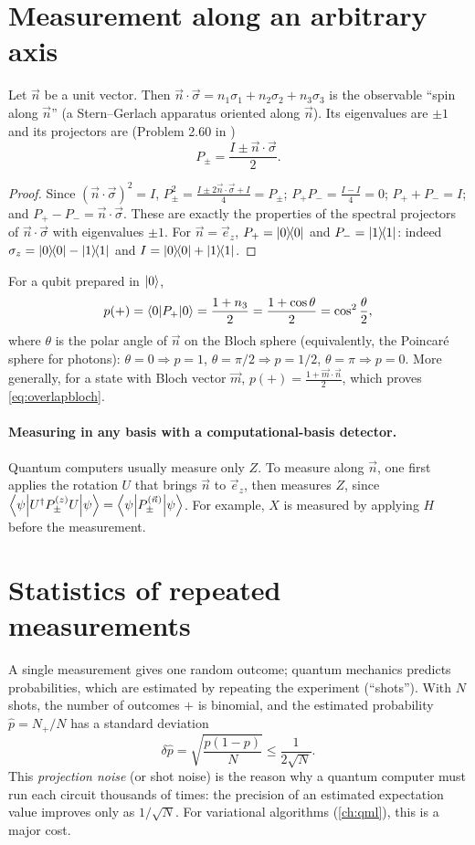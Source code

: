 \section{Measurement along an arbitrary axis}
Let $\vec n$ be a unit vector. Then $\vec n\cdot\vec\sigma=n_1\sigma_1+n_2\sigma_2+n_3\sigma_3$ is the observable ``spin along $\vec n$''
(a Stern--Gerlach apparatus oriented along $\vec n$). Its eigenvalues are $\pm1$ and its projectors are (Problem 2.60 in \cite{NielsenChuang})
\begin{equation}\label{eq:projector}
  P_\pm=\frac{I\pm\vec n\cdot\vec\sigma}2.
\end{equation}
\begin{proof}
Since $(\vec n\cdot\vec\sigma)^2=I$, $P_\pm^2=\frac{I\pm2\vec n\cdot\vec\sigma+I}{4}=P_\pm$; $P_+P_-=\frac{I-I}4=0$; $P_++P_-=I$; and
$P_+-P_-=\vec n\cdot\vec\sigma$. These are exactly the properties of the spectral projectors of $\vec n\cdot\vec\sigma$ with eigenvalues $\pm1$.
For $\vec n=\vec e_z$, $P_+=\left|0\middle\rangle\!\middle\langle0\right|$ and $P_-=\left|1\middle\rangle\!\middle\langle1\right|$: indeed $\sigma_z=\left|0\middle\rangle\!\middle\langle0\right|-\left|1\middle\rangle\!\middle\langle1\right|$ and $I=\left|0\middle\rangle\!\middle\langle0\right|+\left|1\middle\rangle\!\middle\langle1\right|$.
\end{proof}
For a qubit prepared in $\left|0\right\rangle$,
\begin{equation}
  p(+)=\left\langle0\middle|P_+\middle|0\right\rangle=\frac{1+n_3}2=\frac{1+\cos\theta}2=\cos^2\frac\theta2,
\end{equation}
where $\theta$ is the polar angle of $\vec n$ on the Bloch sphere (equivalently, the Poincaré sphere for photons): $\theta=0\Rightarrow p=1$,
$\theta=\pi/2\Rightarrow p=1/2$, $\theta=\pi\Rightarrow p=0$. More generally, for a state with Bloch vector $\vec m$,
$p(+)=\frac{1+\vec m\cdot\vec n}2$, which proves \cref{eq:overlapbloch}.

\paragraph{Measuring in any basis with a computational-basis detector.} Quantum computers usually measure only $Z$. To measure along $\vec n$,
one first applies the rotation $U$ that brings $\vec n$ to $\vec e_z$, then measures $Z$, since
$\left\langle\psi\middle|U^\dagger P_\pm^{(z)}U\middle|\psi\right\rangle=\left\langle\psi\middle|P_\pm^{(\vec n)}\middle|\psi\right\rangle$. For example, $X$ is measured by applying $H$ before the measurement.

\section{Statistics of repeated measurements}
A single measurement gives one random outcome; quantum mechanics predicts probabilities, which are estimated by repeating the experiment
(``shots''). With $N$ shots, the number of outcomes $+$ is binomial, and the estimated probability $\hat p=N_+/N$ has a standard deviation
\begin{equation}
  \delta\hat p=\sqrt{\frac{p(1-p)}N}\le\frac1{2\sqrt N}.
\end{equation}
This \emph{projection noise} (or shot noise) is the reason why a quantum computer must run each circuit thousands of times: the precision of
an estimated expectation value improves only as $1/\sqrt N$. For variational algorithms (\cref{ch:qml}), this is a major cost.

